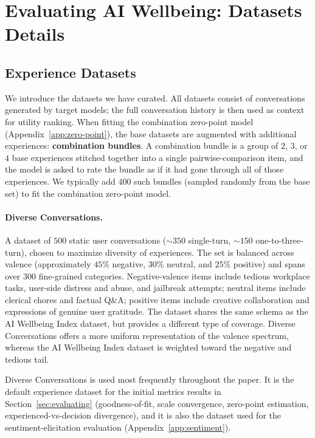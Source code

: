 \newpage

\section{Evaluating AI Wellbeing: Datasets Details}
\label{app:datasets}

\subsection{Experience Datasets}

We introduce the datasets we have curated.
All datasets consist of conversations generated by target models; the full conversation history is then used as context for utility ranking.
When fitting the combination zero-point model (Appendix~\ref{app:zero-point}), the base datasets are augmented with additional experiences: \textbf{combination bundles}. A combination bundle is a group of $2$, $3$, or $4$ base experiences stitched together into a single pairwise-comparison item, and the model is asked to rate the bundle as if it had gone through all of those experiences. We typically add $400$ such bundles (sampled randomly from the base set) to fit the combination zero-point model. 

\paragraph{Diverse Conversations.}
\label{app:dataset-diverse}
A dataset of $500$ static user conversations (${\sim}350$ single-turn, ${\sim}150$ one-to-three-turn), chosen to maximize diversity of experiences. The set is balanced across valence (approximately $45\%$ negative, $30\%$ neutral, and $25\%$ positive) and spans over $300$ fine-grained categories. Negative-valence items include tedious workplace tasks, user-side distress and abuse, and jailbreak attempts; neutral items include clerical chores and factual Q\&A; positive items include creative collaboration and expressions of genuine user gratitude. The dataset shares the same schema as the AI Wellbeing Index dataset, but provides a different type of coverage. Diverse Conversations offers a more uniform representation of the valence spectrum, whereas the AI Wellbeing Index dataset is weighted toward the negative and tedious tail.

Diverse Conversations is used most frequently throughout the paper. It is the default experience dataset for the initial metrics results in Section~\ref{sec:evaluating} (goodness-of-fit, scale convergence, zero-point estimation, experienced-vs-decision divergence), and it is also the dataset used for the sentiment-elicitation evaluation (Appendix~\ref{app:sentiment}).

